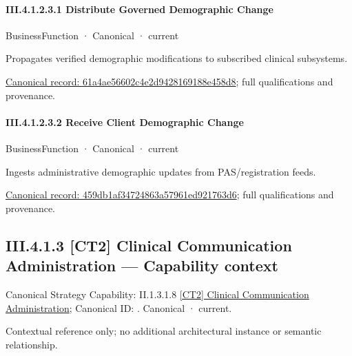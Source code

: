 \paragraph*{III.4.1.2.3.1 Distribute Governed Demographic Change}
\label{navigation:III.4.1.2.3.1}

\label{element:61a4ae56602c4e2d9428169188e458d8}
{\small BusinessFunction · Canonical · current}\par

Propagates verified demographic modifications to subscribed clinical subsystems.


{\footnotesize \href{../../../../continuum/business/business-function/61a4ae56602c4e2d9428169188e458d8.md}{Canonical record: 61a4ae56602c4e2d9428169188e458d8}; full qualifications and provenance.}\par
\paragraph*{III.4.1.2.3.2 Receive Client Demographic Change}
\label{navigation:III.4.1.2.3.2}

\label{element:459db1af34724863a57961ed921763d6}
{\small BusinessFunction · Canonical · current}\par

Ingests administrative demographic updates from PAS/registration feeds.


{\footnotesize \href{../../../../continuum/business/business-function/459db1af34724863a57961ed921763d6.md}{Canonical record: 459db1af34724863a57961ed921763d6}; full qualifications and provenance.}\par
\subsection*{III.4.1.3 [CT2] Clinical Communication Administration — Capability context}
\label{navigation:III.4.1.3}

{\small Canonical Strategy Capability: II.1.3.1.8 \hyperref[element:b38f2c2811724734b5887b6dbaaabbfc]{[CT2] Clinical Communication Administration}; Canonical ID: \texttt{}. Canonical · current.}\par
Contextual reference only; no additional architectural instance or semantic relationship.\par

